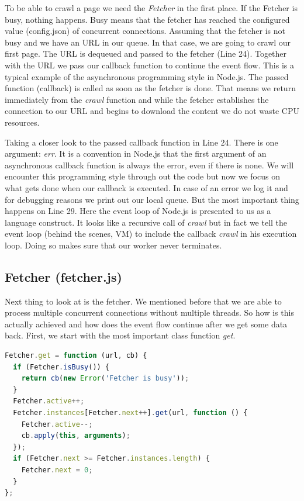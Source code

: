 To be able to crawl a page we need the \emph{Fetcher} in the first place. If the Fetcher is busy, nothing happens. Busy means that the fetcher has reached the configured value (config.json) of concurrent connections.
Assuming that the fetcher is not busy and we have an URL in our queue. In that case, we are going to crawl our first page. The URL is dequeued and passed to the fetcher (Line 24). Together with the URL we pass our callback function to continue the event flow. This is a typical example of the asynchronous programming style in Node.js. The passed function (callback) is called as soon as the fetcher is done. That means we return immediately from the \emph{crawl} function and while the fetcher establishes the connection to our URL and begins to download the content we do not waste CPU resources. 

Taking a closer look to the passed callback function in Line 24. There is one argument: \emph{err}. It is a convention in Node.js that the first argument of an asynchronous callback function is always the error, even if there is none. We will encounter this programming style through out the code but now we focus on what gets done when our callback is executed. In case of an error we log it and for debugging reasons we print out our local queue. But the most important thing happens on Line 29. Here the event loop of Node.js is presented to us as a language construct. It looks like a recursive call of \emph{crawl} but in fact we tell the event loop (behind the scenes, VM) to include the callback \emph{crawl} in his execution loop. Doing so makes sure that our worker never terminates.

\subsection{Fetcher (fetcher.js)}
Next thing to look at is the fetcher. We mentioned before that we are able to process multiple concurrent connections without multiple threads. So how is this actually achieved and how does the event flow continue after we get some data back. First, we start with the most important class function \emph{get}.

\begin{lstlisting}[language=JavaScript]
Fetcher.get = function (url, cb) {
  if (Fetcher.isBusy()) {
    return cb(new Error('Fetcher is busy'));
  }
  Fetcher.active++;
  Fetcher.instances[Fetcher.next++].get(url, function () {
    Fetcher.active--;
    cb.apply(this, arguments);
  });
  if (Fetcher.next >= Fetcher.instances.length) {
    Fetcher.next = 0;
  }
};
\end{lstlisting}

